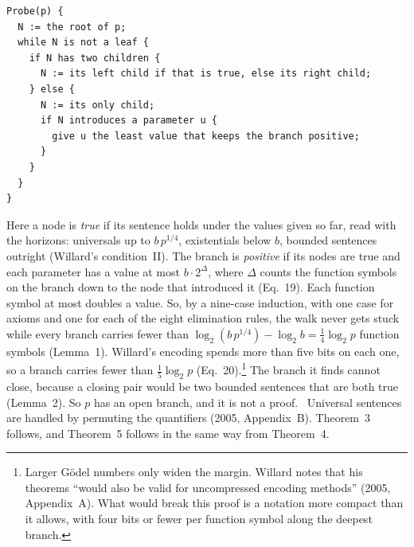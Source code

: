 \documentclass[11pt]{article}
\newcommand{\contra}{~\text{\Lightning}}  %
\theoremstyle{plain}
\theoremstyle{definition}
\begin{document}
\noindent\begin{minipage}{\linewidth}
\begin{lstlisting}
Probe(p) {
  N := the root of p;
  while N is not a leaf {
    if N has two children {
      N := its left child if that is true, else its right child;
    } else {
      N := its only child;
      if N introduces a parameter u {
        give u the least value that keeps the branch positive;
      }
    }
  }
}
\end{lstlisting}
\end{minipage}
Here a node is \emph{true} if its sentence holds under the values given so
far, read with the horizons: universals up to $b\,p^{1/4}$, existentials below
$b$, bounded sentences outright (Willard's condition~II). The branch is
\emph{positive} if its nodes are true and each parameter has a value at most
$b \cdot 2^\Delta$, where $\Delta$ counts the function symbols on the branch
down to the node that introduced it (Eq.~19). Each function symbol at most
doubles a value. So, by a nine-case induction, with one case for axioms and
one for each of the eight elimination rules, the walk never gets stuck while
every branch carries fewer than
$\log_2(b\,p^{1/4}) - \log_2 b = \tfrac14 \log_2 p$ function symbols
(Lemma~1). Willard's encoding spends more than five bits on each one, so a
branch carries fewer than $\tfrac15\log_2 p$ (Eq.~20).\footnote{Larger Gödel numbers only widen
the margin. Willard notes that his theorems ``would also be valid for
uncompressed encoding methods'' (2005, Appendix~A). What would break this
proof is a notation more compact than it allows, with four bits or fewer per
function symbol along the deepest branch.} The branch it finds cannot close,
because a closing pair would be two bounded sentences that are both true
(Lemma~2). So $p$ has an open branch, and it is not a proof.\contra{}
Universal sentences are handled by permuting the quantifiers (2005,
Appendix~B). Theorem~3 follows, and Theorem~5 follows in the same way from
Theorem~4.
\end{document}

